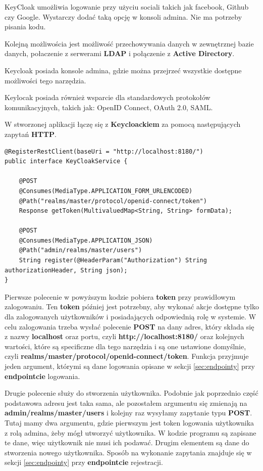 \documentclass{iiuwb}
\begin{document}
KeyCloak umożliwia logowanie przy użyciu sociali takich jak facebook, Github czy Google. Wystarczy dodać taką opcję w konsoli admina. Nie ma potrzeby pisania kodu.

Kolejną możliwościa jest możliwość przechowywania danych w zewnętrznej bazie danych, połaczenie z serwerami \textbf{LDAP} i połączenie z \textbf{Active Directory}.

Keycloak posiada konsole admina, gdzie można przejrzeć wszystkie dostępne możliwości tego narzędzia.

Keylocak posiada również wsparcie dla standardowych protokołów komunikacyjnych, takich jak: OpenID Connect, OAuth 2.0, SAML. 

W stworzonej aplikacji łączę się z \textbf{Keycloackiem} za pomocą następujących zapytań \textbf{HTTP}.

\begin{lstlisting}[breaklines=true]
@RegisterRestClient(baseUri = "http://localhost:8180/")
public interface KeyCloakService {

    @POST
    @Consumes(MediaType.APPLICATION_FORM_URLENCODED)
    @Path("realms/master/protocol/openid-connect/token")
    Response getToken(MultivaluedMap<String, String> formData);

    @POST
    @Consumes(MediaType.APPLICATION_JSON)
    @Path("admin/realms/master/users")
    String register(@HeaderParam("Authorization") String authorizationHeader, String json);
}
\end{lstlisting}

Pierwsze polecenie w powyższym kodzie pobiera \textbf{token} przy prawidłowym zalogowaniu. Ten \textbf{token} później jest potrzebny, aby wykonać akcje dostępne tylko dla zalogowanych użytkowników i posiadających odpowiednią rolę w systemie. W celu zalogowania trzeba wysłać polecenie \textbf{POST} na dany adres, który składa się z nazwy \textbf{localhost} oraz portu, czyli \textbf{http://localhost:8180/} oraz kolejnych wartości, które są specificzne dla tego narzędzia i są one ustawione domyślnie, czyli \textbf{realms/master/protocol/openid-connect/token}. Funkcja przyjmuje jeden argument, którymi są dane logowania opisane w sekcji \ref{sec:endpointy} przy \textbf{endpointcie} logowania.

Drugie polecenie służy do stworzenia użytkownika. Podobnie jak poprzednio część podstawowa adresu jest taka sama, ale pozostałem argumentu się zmienają na \textbf{admin/realms/master/users} i kolejny raz wysyłamy zapytanie typu \textbf{POST}. Tutaj mamy dwa argumentu, gdzie pierwszym jest token logowania użytkownika z rolą admina, żeby mógł utworzyć użytkownika. W kodzie programu są zapisane te dane, więc użytkownik nie musi ich podawać. Drugim elementem są dane do stworzenia nowego użytkownika. Sposób na wykonanie zapytania znajduje się w sekcji \ref{sec:endpointy} przy \textbf{endpointcie} rejestracji.
\end{document}
